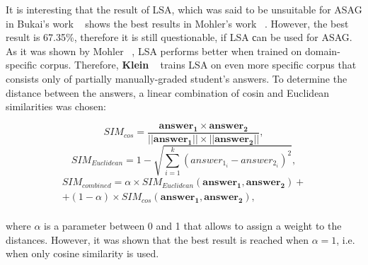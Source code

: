 It is interesting that the result of LSA, which was said to be unsuitable for ASAG in Bukai's work ~\cite{SAMText} shows the best results in Mohler's work ~\cite{Mohler}. However, the best result is 67.35\%, therefore it is still questionable, if LSA сan be used for ASAG. \\

As it was shown by Mohler ~\cite{Mohler}, LSA performs better when trained on domain-specific corpus. Therefore, \textbf{Klein} ~\cite{Klein} trains LSA on even more specific corpus that consists only of partially manually-graded student's answers. To determine the distance between the answers, a linear combination of cosin and Euclidean similarities was chosen:

\begin{equation} \label{eq:cos}
SIM_{cos} = \frac{\pmb{answer_1} \times \pmb{answer_2}}{||\pmb{answer_1}|| \times ||\pmb{answer_2}||},
\end{equation}
\begin{equation} \label{eq:Euclidean}
SIM_{Euclidean} = 1 - \sqrt{\sum^k_{i=1}(answer_{1_i} - answer_{2_i})^2},
\end{equation}
\begin{equation} \label{eq:combinedCE}
\begin{array}{l}
SIM_{combined} = \alpha  \times SIM_{Euclidean}(\pmb{answer_1}, \pmb{answer_2}) + \\ + (1-\alpha) \times SIM_{cos}(\pmb{answer_1}, \pmb{answer_2}),
\end{array}
\end{equation}\\
 where $\alpha$ is a parameter between 0 and 1 that allows to assign a weight to the distances. However, it was shown that the best result is reached when $\alpha = 1$, i.e. when only cosine similarity is used. \\
  
